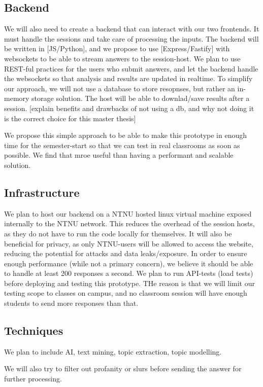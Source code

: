 \subsection{Backend}
We will also need to create a backend that can interact with our two frontends. It must handle the sessions and take care of processing the inputs. The backend will be written in [JS/Python], and we propose to use [Express/Fastify] with websockets to be able to stream answers to the session-host. We plan to use REST-ful practices for the users who submit answers, and let the backend handle the websockets so that analysis and results are updated in realtime. To simplify our approach, we will not use a database to store resopnses, but rather an in-memory storage solution. The host will be able to downlad/save results after a session. [explain benefits and drawbacks of not using a db, and why not doing it is the correct choice for this master thesis]

We propose this simple approach to be able to make this prototype in enough time for the semester-start so that we can test in real classrooms as soon as possible. We find that mroe useful than having a performant and scalable solution. 


\subsection{Infrastructure}
We plan to host our backend on a NTNU hosted linux virtual machine exposed internally to the NTNU network. This reduces the overhead of the session hosts, as they do not have to run the code locally for themselves. It will also be beneficial for privacy, as only NTNU-users will be allowed to access the website, reducing the potential for attacks and data leaks/exposure. In order to ensure enough performance (while not a primary concern), we believe it should be able to handle at least 200 responses a second. We plan to run API-tests (load tests) before deploying and testing this prototype. THe reason is that we will limit our testing scope to classes on campus, and no classroom session will have enough students to send more responses than that.


\subsection{Techniques}
We plan to include AI, text mining, topic extraction, topic modelling. 

We will also try to filter out profanity or slurs before sending the answer for further processing. 

